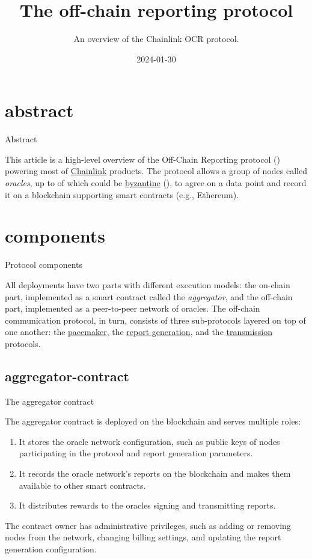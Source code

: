 \documentclass{article}
\title{The off-chain reporting protocol}
\subtitle{An overview of the Chainlink OCR protocol.}
\date{2024-01-30}
\begin{document}
\section{abstract}{Abstract}

This article is a high-level overview of the Off-Chain Reporting protocol () powering most of \href{https://chain.link/}{Chainlink} products.
The protocol allows a group of  nodes called \emph{oracles}, up to  of which could be \href{https://en.wikipedia.org/wiki/Byzantine_fault}{byzantine} (), to agree on a data point and record it on a blockchain supporting smart contracts (e.g., Ethereum).

\section{components}{Protocol components}

All  deployments have two parts with different execution models: the on-chain part, implemented as a smart contract called the \emph{aggregator}, and the off-chain part, implemented as a peer-to-peer network of oracles.
The off-chain communication protocol, in turn, consists of three sub-protocols layered on top of one another: the \href{#pacemaker}{pacemaker}, the \href{#report-generation}{report generation}, and the \href{#transmission}{transmission} protocols. 

\subsection{aggregator-contract}{The aggregator contract}

The aggregator contract is deployed on the blockchain and serves multiple roles:
\begin{enumerate}
    \item It stores the oracle network configuration, such as public keys of nodes participating in the protocol and report generation parameters.
    \item It records the oracle network's reports on the blockchain and makes them available to other smart contracts.
    \item It distributes rewards to the oracles signing and transmitting reports.
\end{enumerate}

The contract owner has administrative privileges, such as adding or removing nodes from the network, changing billing settings, and updating the report generation configuration.
\end{document}
